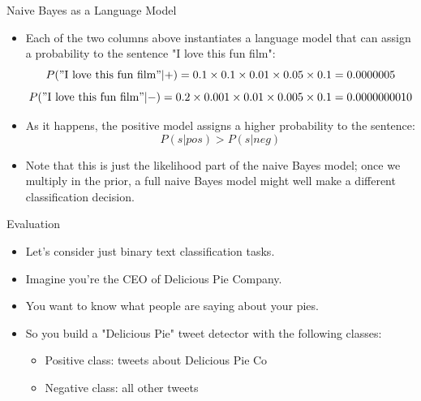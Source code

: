 \documentclass[handout]{beamer}
\begin{document}
\begin{frame}{Naive Bayes as a Language Model}
\scriptsize


\begin{itemize}
 \item  Each of the two columns above instantiates a language model that can assign a probability to the sentence "I love this fun film":
\[P("\text{I love this fun film}"|+) = 0.1 \times 0.1 \times 0.01 \times 0.05 \times 0.1 = 0.0000005\]
\[P("\text{I love this fun film}"|-) = 0.2 \times 0.001 \times 0.01 \times 0.005 \times 0.1 = 0.0000000010\]

\item As it happens, the positive model assigns a higher probability to the sentence:
\[P(s|pos) > P(s|neg)\]

\item Note that this is just the likelihood part of the naive Bayes model; once we multiply in the prior, a full naive Bayes model might well make a different classification decision.
\end{itemize}




\end{frame}

\begin{frame}{Evaluation}

\begin{itemize}
 \item Let's consider just binary text classification tasks. 
 \item Imagine you're the CEO of Delicious Pie Company. 
\item You want to know what people are saying about your pies. 
\item So you build a "Delicious Pie" tweet detector with the following classes:
\begin{itemize}
\item Positive class: tweets about Delicious Pie Co
\item Negative class: all other tweets
\end{itemize}
\end{itemize}


\end{frame}
\end{document}
